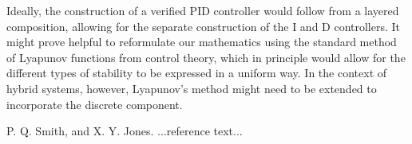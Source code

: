 \documentclass[preprint,nocopyrightspace]{sigplanconf}
\begin{document}
Ideally, the construction of a verified PID controller would follow from a layered composition, allowing for the separate construction of the I and D controllers. It might prove helpful to reformulate our mathematics using the standard method of Lyapunov functions from control theory, which in principle would allow for the different types of stability to be expressed in a uniform way. In the context of hybrid systems, however, Lyapunov's method might need to be extended to incorporate the discrete component.


















\begin{thebibliography}{}
\softraggedright
P. Q. Smith, and X. Y. Jones. ...reference text...

\end{thebibliography}
\end{document}
